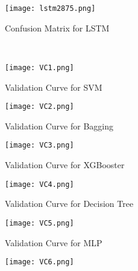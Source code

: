 \documentclass[12pt, English]{article}
\begin{document}
\begin{normalsize}
\begin{figure}
\begin{center}
\texttt{[image: lstm2875.png]}
\end{center}
\begin{center}
\renewcommand{\thefigure}{5.7}
\caption{\footnotesize Confusion Matrix for LSTM }
\end{center}
\\
\begin{center}
\texttt{[image: VC1.png]}
\end{center}
\begin{center}
\renewcommand{\thefigure}{5.8}
\caption{\footnotesize Validation Curve for SVM }
\end{center}
\end{figure}
\begin{figure}
\begin{center}
\texttt{[image: VC2.png]}
\end{center}
\begin{center}
\renewcommand{\thefigure}{5.9}
\caption{\footnotesize Validation Curve for Bagging}
\end{center}
\begin{center}
\texttt{[image: VC3.png]}
\end{center}
\begin{center}
\renewcommand{\thefigure}{5.10}
\caption{\footnotesize Validation Curve for XGBooster }
\end{center}
\end{figure}
\begin{figure}
\begin{center}
\texttt{[image: VC4.png]}
\end{center}
\begin{center}
\renewcommand{\thefigure}{5.11}
\caption{\footnotesize Validation Curve for Decision Tree }
\end{center}
\begin{center}
\texttt{[image: VC5.png]}
\end{center}
\begin{center}
\renewcommand{\thefigure}{5.12}
\caption{\footnotesize Validation Curve for MLP }
\end{center}
\end{figure}
\begin{figure}
\begin{center}
\texttt{[image: VC6.png]}

\end{center}
\end{figure}
\end{normalsize}
\end{document}
